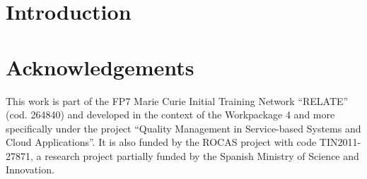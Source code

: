 \documentclass{llncs}
\begin{document}
\section{Introduction}

% 
% 
% 
% 

\section{Acknowledgements}
This work is part of the FP7 Marie Curie Initial Training Network ``RELATE'' (cod. 264840) and developed in the context 
of the Workpackage 4 and more specifically under the project ``Quality Management in Service-based Systems and Cloud Applications''. It is 
also funded by the ROCAS project with code TIN2011-27871, a research project partially funded by the Spanish Ministry of Science and Innovation.

% 
% 
\end{document}
